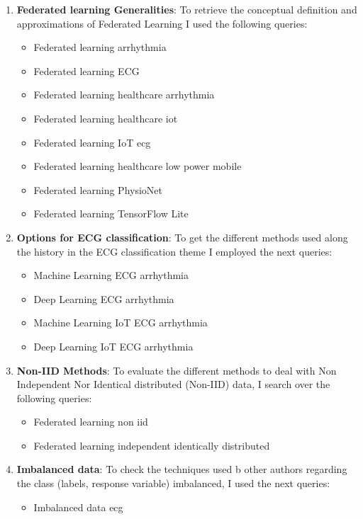 \begin{enumerate}
    \item \textbf{Federated learning Generalities}: To retrieve the conceptual definition and approximations of Federated Learning I used the following queries:
    \begin{itemize}
        \item Federated learning arrhythmia
        \item Federated learning ECG
        \item Federated learning healthcare arrhythmia
        \item Federated learning healthcare iot
        \item Federated learning IoT ecg
        \item Federated learning healthcare low power mobile
        \item Federated learning PhysioNet
        \item Federated learning TensorFlow Lite
    \end{itemize}
    \item \textbf{Options for ECG classification}: To get the different methods used along the history in the ECG classification theme I employed the next queries:
    \begin{itemize}
        \item Machine Learning ECG arrhythmia
        \item Deep Learning ECG arrhythmia
        \item Machine Learning IoT ECG arrhythmia
        \item Deep Learning IoT ECG arrhythmia
    \end{itemize}
    \item \textbf{Non-IID Methods}: To evaluate the different methods to deal with Non Independent Nor Identical distributed (Non-IID) data, I search over the following queries:
    \begin{itemize}
        \item Federated learning non iid
        \item Federated learning independent identically distributed
    \end{itemize}
    \item \textbf{Imbalanced data}: To check the techniques used b other authors regarding the class (labels, response variable) imbalanced, I used the next queries:
    \begin{itemize}
        \item Imbalanced data ecg

\end{itemize}
\end{enumerate}
